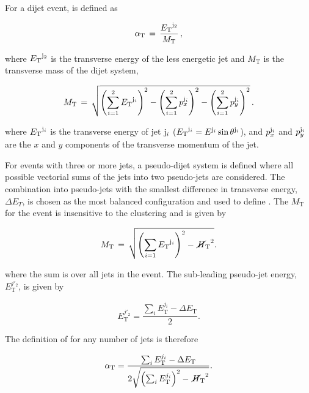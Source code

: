 For a dijet event, \alphat is defined as

\begin{equation}
\label{eq:alphat}
\alpha_{\text{T}}\, =\, \frac{{E_{\text T}}^{{\rm j}_2}}{M_\text{T}} \, ,
\end{equation}

\noindent where ${E_{\text T}}^{\rm j_2}$ is the transverse energy of the 
less energetic jet and $M_\text{T}$ is the transverse
mass of the dijet system, 

\begin{equation}
  \label{eq:mt}
  M_\text{T}\, = \,\sqrt{ \left( \sum_{i=1}^2 {E_{\text T}}^{{\rm j}_i}
    \right)^2 - \left( \sum_{i=1}^2 p_x^{{\rm j}_i} \right)^2 - \left(
      \sum_{i=1}^2 p_y^{{\rm j}_i} \right)^2} \, .
\end{equation}

\noindent where ${E_{\text T}}^{{\rm j}_i}$ is the transverse energy of jet ${\rm j}_i$ 
(${E_{\text T}}^{{\rm j}_i} = E^{{\rm j}_i}\sin\theta^{{\rm j}_i}$), and
$p_x^{{\rm j}_i}$ and $p_y^{{\rm j}_i}$ are the $x$ and $y$ components
of the transverse momentum of the jet. 

For events with three or more jets, a pseudo-dijet system is defined 
where all possible vectorial sums of the jets into two
pseudo-jets are considered. The combination into pseudo-jets 
with the smallest difference in transverse energy, $\Delta E_T$, is chosen
as the most balanced configuration and used to define \alphat. The $M_\text{T}$ for 
the event is insensitive to the clustering and is given by

\begin{equation}
  \label{eq:mt_njet}
  M_\text{T}\, = \,\sqrt{ \left( \sum_{i=1} {E_{\text T}}^{{\rm{j}}_i}
    \right)^2 - \mbox{$\,\cancel{H}_{\rm T}$}^2}.
\end{equation}

\noindent where the sum is over all jets in the event. The sub-leading pseudo-jet energy, 
$E_{\textrm{T}}^{j'_2}$, is given by

\begin{equation}
E_{\textrm{T}}^{j'_2} = \frac{\sum_{i} E_{\textrm{T}}^{j_i} - \Delta E_{\textrm{T}}}{2}.
\end{equation}

The definition of \alphat for any number of jets is therefore

\begin{equation}
  \label{eq:alphat2}
   \alpha_{\text{T}} = \frac{\sum_{i} E_{\textrm{T}}^{j_i} - \Delta E_{\textrm{T}}}{2\sqrt{\left(\sum_{i} E_{\textrm{T}}^{j_i}\right)^2 - \mbox{$\,\cancel{H}_{\rm T}$}^2}}.
\end{equation}

